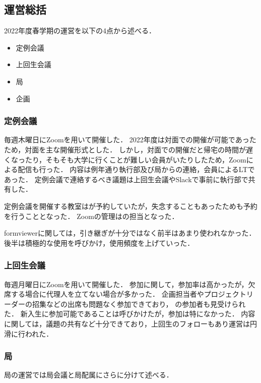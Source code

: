 \subsection*{運営総括}


2022年度春学期の運営を以下の4点から述べる．
\begin{itemize}
    \item 定例会議
    \item 上回生会議
    \item 局
    \item 企画
\end{itemize}

\subsubsection*{定例会議}
毎週木曜日にZoomを用いて開催した．
2022年度は対面での開催が可能であったため，対面を主な開催形式とした．
しかし，対面での開催だと帰宅の時間が遅くなったり，そもそも大学に行くことが難しい会員がいたりしたため，Zoomによる配信も行った．
内容は例年通り執行部及び局からの連絡，会員によるLTであった．
定例会議で連絡するべき議題は上回生会議やSlackで事前に執行部で共有した．

定例会議を開催する教室は\president{}が予約していたが，失念することもあったため\kensuiChief{}も予約を行うこととなった．
Zoomの管理は\subPresident{}の担当となった．

formviewerに関しては，引き継ぎが十分ではなく前半はあまり使われなかった．
後半は積極的な使用を呼びかけ，使用頻度を上げていった．

\subsubsection*{上回生会議}
毎週月曜日にZoomを用いて開催した．
参加に関して，参加率は高かったが，欠席する場合に代理人を立てない場合が多かった．
企画担当者やプロジェクトリーダーの招集などの出席も問題なく参加できており，
\fourthGrade{}の参加者も見受けられた．
新入生に参加可能であることは呼びかけたが，参加は特になかった．
内容に関しては，議題の共有など十分できており，上回生のフォローもあり運営は円滑に行われた．

\subsubsection*{局}
局の運営では局会議と局配属にさらに分けて述べる．
